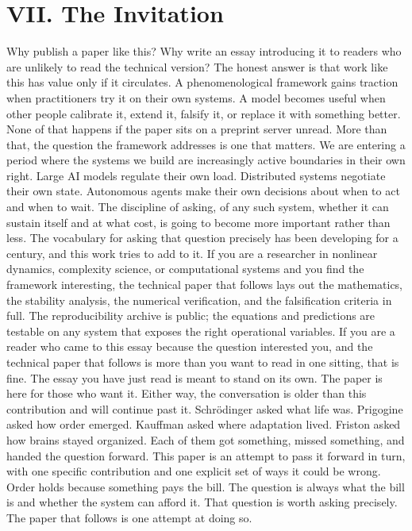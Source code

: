 \documentclass[12pt]{article}
\begin{document}
\section*{VII. The Invitation}

Why publish a paper like this? Why write an essay introducing it to readers who are unlikely to read the technical version? The honest answer is that work like this has value only if it circulates. A phenomenological framework gains traction when practitioners try it on their own systems. A model becomes useful when other people calibrate it, extend it, falsify it, or replace it with something better. None of that happens if the paper sits on a preprint server unread. More than that, the question the framework addresses is one that matters. We are entering a period where the systems we build are increasingly active boundaries in their own right. Large AI models regulate their own load. Distributed systems negotiate their own state. Autonomous agents make their own decisions about when to act and when to wait. The discipline of asking, of any such system, whether it can sustain itself and at what cost, is going to become more important rather than less. The vocabulary for asking that question precisely has been developing for a century, and this work tries to add to it. If you are a researcher in nonlinear dynamics, complexity science, or computational systems and you find the framework interesting, the technical paper that follows lays out the mathematics, the stability analysis, the numerical verification, and the falsification criteria in full. The reproducibility archive is public; the equations and predictions are testable on any system that exposes the right operational variables. If you are a reader who came to this essay because the question interested you, and the technical paper that follows is more than you want to read in one sitting, that is fine. The essay you have just read is meant to stand on its own. The paper is here for those who want it. Either way, the conversation is older than this contribution and will continue past it. Schr{\"o}dinger asked what life was. Prigogine asked how order emerged. Kauffman asked where adaptation lived. Friston asked how brains stayed organized. Each of them got something, missed something, and handed the question forward. This paper is an attempt to pass it forward in turn, with one specific contribution and one explicit set of ways it could be wrong. Order holds because something pays the bill. The question is always what the bill is and whether the system can afford it. That question is worth asking precisely. The paper that follows is one attempt at doing so.
\end{document}
